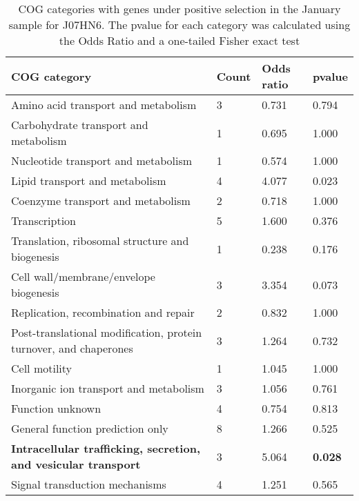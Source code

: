 \begin{table}[]
\footnotesize 
	\tabcolsep=0.11cm 
\caption{COG categories with genes under positive selection in the January sample for J07HN6. The pvalue for each category was calculated using the Odds Ratio and a one-tailed Fisher exact test} 
\begin{tabularx}{\textwidth}{L{6cm}R{2cm}R{2cm}R{2cm}} 
\hline 
\textbf{COG category} & \textbf{Count} & \textbf{Odds ratio} & \textbf{pvalue} \\ 
\hline 
Amino acid transport and metabolism & 3 & 0.731 & 0.794 \\ 
Carbohydrate transport and metabolism & 1 & 0.695 & 1.000 \\ 
Nucleotide transport and metabolism & 1 & 0.574 & 1.000 \\ 
Lipid transport and metabolism & 4 & 4.077 & 0.023 \\ 
Coenzyme transport and metabolism & 2 & 0.718 & 1.000 \\ 
Transcription & 5 & 1.600 & 0.376 \\ 
Translation, ribosomal structure and biogenesis & 1 & 0.238 & 0.176 \\ 
Cell wall/membrane/envelope biogenesis & 3 & 3.354 & 0.073 \\ 
Replication, recombination and repair & 2 & 0.832 & 1.000 \\ 
Post-translational modification, protein turnover, and chaperones & 3 & 1.264 & 0.732 \\ 
Cell motility & 1 & 1.045 & 1.000 \\ 
Inorganic ion transport and metabolism & 3 & 1.056 & 0.761 \\ 
Function unknown & 4 & 0.754 & 0.813 \\ 
General function prediction only & 8 & 1.266 & 0.525 \\ 
\textbf{Intracellular trafficking, secretion, and vesicular transport} & 3 & 5.064 & \textbf{0.028} \\ 
Signal transduction mechanisms & 4 & 1.251 & 0.565 \\ 
\end{tabularx} 
\label{January_COG_Selection_J07HN6} 
 \end{table} 


